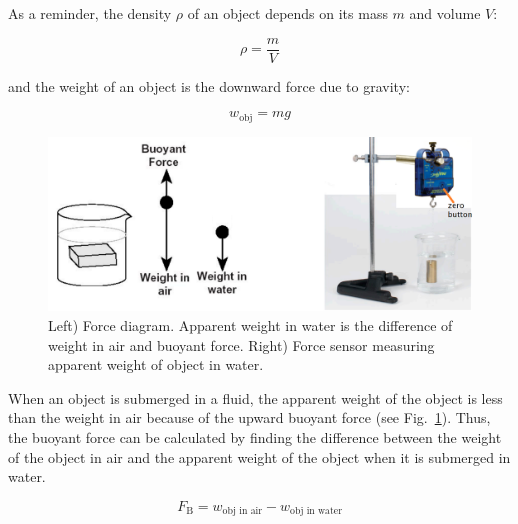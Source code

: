 
As a reminder, the density $\rho$ of an object depends on its mass $m$ and volume $V$:

\begin{equation}
\label{M08_fluids_Eq02}
    \rho = \frac{m}{V}
\end{equation}

and the weight of an object is the downward force due to gravity:

\begin{equation}
\label{M08_fluids_Eq03}
    w_\text{obj} = mg
\end{equation}




\begin{figure}[ht]
  \begin{center}
    \includegraphics[width=4.9in]{Fall/Experiment08Figures_Fluids/M08_fig06.png}
  \end{center}
  \caption{Left) Force diagram. Apparent weight in water is the difference of weight in air and buoyant force. Right) Force sensor measuring apparent weight of object in water.}
  \label{M08_fluids_Fig04}
\end{figure}

When an object is submerged in a fluid, the apparent weight of the object is less than the weight in air because of the upward buoyant force (see Fig.~\ref{M08_fluids_Fig04}). Thus, the buoyant force can be calculated by finding the difference between the weight of the object in air and the apparent weight of the object when it is submerged in water.

\begin{equation}
\label{M08_fluids_Eq04}
    F_\text{B} = w_\text{obj in air} - w_\text{obj in water}
\end{equation}



